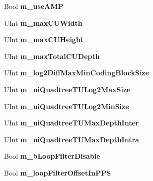 \begin{DoxyCompactItemize}
\mbox{\label{class_t_enc_cfg_a3ef4026b018ca7fd7bba9f291fdd676a}} 
Bool {\bfseries m\+\_\+use\+A\+MP}
\item 
\mbox{\label{class_t_enc_cfg_ac8209ca84f3229a778c614b9ba3ea5a2}} 
U\+Int {\bfseries m\+\_\+max\+C\+U\+Width}
\item 
\mbox{\label{class_t_enc_cfg_a006046ad6ec3af81120da8dae4b603f0}} 
U\+Int {\bfseries m\+\_\+max\+C\+U\+Height}
\item 
\mbox{\label{class_t_enc_cfg_a7affbc8973f799ccf84c53952b82e645}} 
U\+Int {\bfseries m\+\_\+max\+Total\+C\+U\+Depth}
\item 
\mbox{\label{class_t_enc_cfg_a142bc2d2a84bcc550e337b5ed8151bf3}} 
U\+Int {\bfseries m\+\_\+log2\+Diff\+Max\+Min\+Coding\+Block\+Size}
\item 
\mbox{\label{class_t_enc_cfg_acc062dd1a353f4c71bb7db162771980a}} 
U\+Int {\bfseries m\+\_\+ui\+Quadtree\+T\+U\+Log2\+Max\+Size}
\item 
\mbox{\label{class_t_enc_cfg_acd1bcac80213116488c5e2361a4ab720}} 
U\+Int {\bfseries m\+\_\+ui\+Quadtree\+T\+U\+Log2\+Min\+Size}
\item 
\mbox{\label{class_t_enc_cfg_a5635a7b56120512133810082c3593ed5}} 
U\+Int {\bfseries m\+\_\+ui\+Quadtree\+T\+U\+Max\+Depth\+Inter}
\item 
\mbox{\label{class_t_enc_cfg_a8819ec92a36413b1de6e71e0b0cf38ae}} 
U\+Int {\bfseries m\+\_\+ui\+Quadtree\+T\+U\+Max\+Depth\+Intra}
\item 
\mbox{\label{class_t_enc_cfg_a9f13ddb0f3996f4ee1562f61716c5c1a}} 
Bool {\bfseries m\+\_\+b\+Loop\+Filter\+Disable}
\item 
\mbox{\label{class_t_enc_cfg_ada4a80f1c9803b4571fc06b2743deede}} 
Bool {\bfseries m\+\_\+loop\+Filter\+Offset\+In\+P\+PS}
\item 
\mbox{\label{class_t_enc_cfg_a85a92049036b77c54a4b23373061edce}} 

\end{DoxyCompactItemize}
